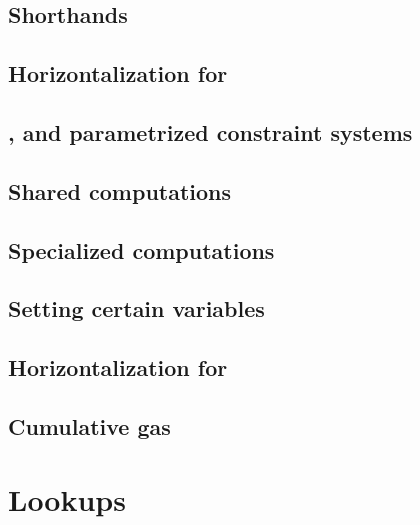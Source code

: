 \subsection{Shorthands}                                                     \label{txn_data: constraints: shorthands}                     
\subsection{Horizontalization for \rlpTxnMod{}}                             \label{txn_data: constraints: horizontalization rlpTxn}       
\subsection{\wcpFlag{}, \eucFlag{} and parametrized constraint systems}     \label{txn_data: constraints: comparison constraints}         
\subsection{Shared computations}                                            \label{txn_data: constraints: common computations}            
\subsection{Specialized computations}                                       \label{txn_data: constraints: specialized computations}       
\subsection{Setting certain variables}                                      \label{txn_data: constraints: setting variables}              
\subsection{Horizontalization for \rlpTxnRcptMod{}}                         \label{txn_data: constraints: horizontalization rlpTxnRcpt}   
\subsection{Cumulative gas}                                                 \label{txn_data: constraints: cumulative gas}                 

\section{Lookups}                                                           \label{txn_data: lookups}                                 
